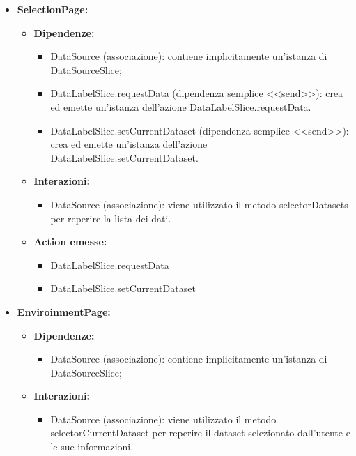 \begin{itemize}
    \item \textbf{SelectionPage:}
    \begin{itemize}
        \item \textbf{Dipendenze:}
        \begin{itemize}
            \item DataSource (associazione): contiene implicitamente un'istanza di DataSourceSlice;
            \item DataLabelSlice.requestData (dipendenza semplice <<send>>): crea ed emette un’istanza dell’azione DataLabelSlice.requestData.
            \item DataLabelSlice.setCurrentDataset (dipendenza semplice <<send>>): crea ed emette un’istanza dell’azione DataLabelSlice.setCurrentDataset.
        \end{itemize} 
        \item \textbf{Interazioni:}
        \begin{itemize}
            \item DataSource (associazione): viene utilizzato il metodo selectorDatasets per reperire la lista dei dati.
        \end{itemize} 
        \item \textbf{Action emesse:}
        \begin{itemize}
            \item DataLabelSlice.requestData
            \item DataLabelSlice.setCurrentDataset
        \end{itemize} 
    \end{itemize}

    \item \textbf{EnviroinmentPage:}
    \begin{itemize}
        \item \textbf{Dipendenze:}
        \begin{itemize}
            \item DataSource (associazione): contiene implicitamente un'istanza di DataSourceSlice;
        \end{itemize} 
        \item \textbf{Interazioni:}
        \begin{itemize}
            \item DataSource (associazione): viene utilizzato il metodo selectorCurrentDataset per reperire il dataset selezionato dall'utente e le sue informazioni.
        \end{itemize}  
    \end{itemize}
\end{itemize}

